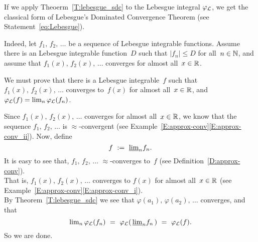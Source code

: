 \documentclass[main.tex]{subfiles}
\begin{document}
%
%
\begin{ex}
\label{E:lebesgue}
If we apply Theoerm~\ref{T:lebesgue_sdc}
to the Lebesgue integral $\varphi_{\mathcal{L}}$,
we get the classical form of 
Lebesgue's Dominated Convergence Theorem
(see Statement~\eqref{eq:Lebesgue}).

Indeed,
let $f_1,\,f_2,\,\dotsc$ be a sequence of Lebesgue integrable functions.
Assume there is an Lebesgue integrable function~$D$ such that
$|f_n|\leq D$ for all~$n\in\mathbb{N}$,
and assume that $f_1(x),\,f_2(x),\,\dotsc$ converges
for almost all~$x\in\mathbb{R}$.

We must prove that there is a Lebesgue integrable~$f$
such that $f_1(x),\,f_2(x),\,\dotsc$
converges to~$f(x)$ for almost all~$x\in\mathbb{R}$,
and $\varphi_{\mathcal{L}}(f) = \lim_n \varphi_{\mathcal{L}}(f_n)$.

Since 
$f_1(x),\,f_2(x),\,\dotsc$ 
converges for almost all~$x\in \mathbb{R}$,
we know that the sequence $f_1,\,f_2,\,\dotsc$
is $\approx$-convergent
(see Example~\ref{E:approx-conv}\ref{E:approx-conv_ii}).
Now, define
\begin{equation*}
f\ :=\  \smash{\underline{\lim}_{n}}{f_n}.
\end{equation*}
It is easy to see that,
$f_1,\,f_2,\,\dotsc$
$\approx$-converges to~$f$
(see Definition~\ref{D:approx-conv}).\\
That is,
$f_1(x),\,f_2(x),\,\dotsc$
converges to $f(x)$ for almost all~$x\in\mathbb{R}$
(see Example~\ref{E:approx-conv}\ref{E:approx-conv_i}).\\
By Theorem~\ref{T:lebesgue_sdc}
we see that $\varphi(a_1),\,\varphi(a_2),\,\dotsc$
converges, and that
\begin{equation*}
{\lim}_n \,\Lphi(f_n)
\ =\ 
\Lphi(\,\llim{n} f_n\,)
\ =\ 
\Lphi(f).
\end{equation*}
So we are done.
\end{ex}
\end{document}
